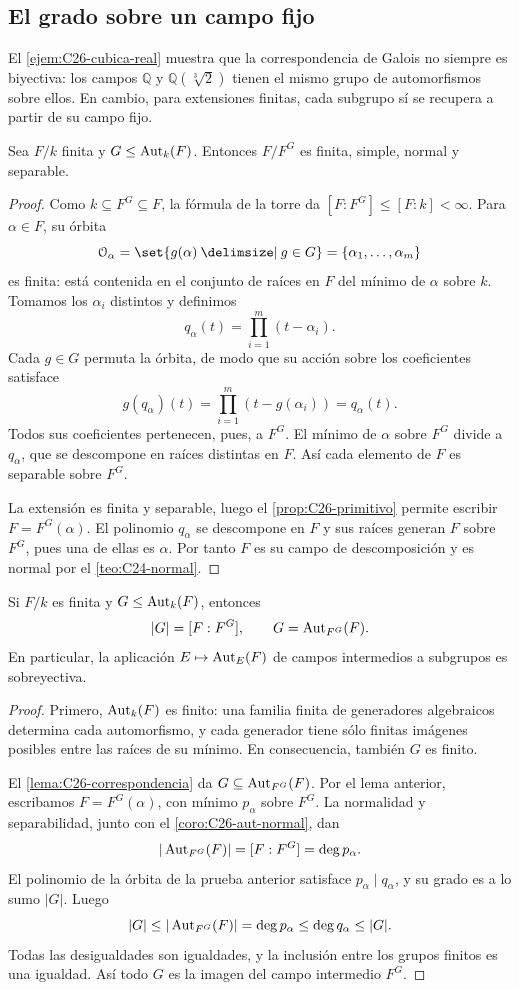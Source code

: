 \subsection{El grado sobre un campo fijo}\label{tema:27-1-1}
El \cref{ejem:C26-cubica-real} muestra que la correspondencia de Galois no siempre es biyectiva: los campos $\mathbb Q$ y $\mathbb Q(\sqrt[3]{2})$ tienen el mismo grupo de automorfismos sobre ellos. En cambio, para extensiones finitas, cada subgrupo sí se recupera a partir de su campo fijo.

\begin{lema}\label{lema:C27-campo-fijo}
Sea $F/k$ finita y $G\leq\operatorname{Aut}_k(F)$. Entonces $F/F^G$ es finita, simple, normal y separable.
\end{lema}
\begin{proof}
Como $k\subseteq F^G\subseteq F$, la fórmula de la torre da $[F:F^G]\leq[F:k]<\infty$. Para $\alpha\in F$, su órbita
\[
\mathcal O_\alpha=\set{g(\alpha)\given g\in G}=\{\alpha_1,\ldots,\alpha_m\}
\]
es finita: está contenida en el conjunto de raíces en $F$ del mínimo de $\alpha$ sobre $k$. Tomamos los $\alpha_i$ distintos y definimos
\[
q_\alpha(t)=\prod_{i=1}^m(t-\alpha_i).
\]
Cada $g\in G$ permuta la órbita, de modo que su acción sobre los coeficientes satisface
\[
g(q_\alpha)(t)=\prod_{i=1}^m(t-g(\alpha_i))=q_\alpha(t).
\]
Todos sus coeficientes pertenecen, pues, a $F^G$. El mínimo de $\alpha$ sobre $F^G$ divide a $q_\alpha$, que se descompone en raíces distintas en $F$. Así cada elemento de $F$ es separable sobre $F^G$.

La extensión es finita y separable, luego el \cref{prop:C26-primitivo} permite escribir $F=F^G(\alpha)$. El polinomio $q_\alpha$ se descompone en $F$ y sus raíces generan $F$ sobre $F^G$, pues una de ellas es $\alpha$. Por tanto $F$ es su campo de descomposición y es normal por el \cref{teo:C24-normal}.
\end{proof}

\begin{prop}\label{prop:C27-artin}
Si $F/k$ es finita y $G\leq\operatorname{Aut}_k(F)$, entonces
\[
|G|=[F:F^G],\qquad G=\operatorname{Aut}_{F^G}(F).
\]
En particular, la aplicación $E\mapsto\operatorname{Aut}_E(F)$ de campos intermedios a subgrupos es sobreyectiva.
\end{prop}
\begin{proof}
Primero, $\operatorname{Aut}_k(F)$ es finito: una familia finita de generadores algebraicos determina cada automorfismo, y cada generador tiene sólo finitas imágenes posibles entre las raíces de su mínimo. En consecuencia, también $G$ es finito.

El \cref{lema:C26-correspondencia} da $G\subseteq\operatorname{Aut}_{F^G}(F)$. Por el lema anterior, escribamos $F=F^G(\alpha)$, con mínimo $p_\alpha$ sobre $F^G$. La normalidad y separabilidad, junto con el \cref{coro:C26-aut-normal}, dan
\[
|\operatorname{Aut}_{F^G}(F)|=[F:F^G]=\deg p_\alpha.
\]
El polinomio de la órbita de la prueba anterior satisface $p_\alpha\mid q_\alpha$, y su grado es a lo sumo $|G|$. Luego
\[
|G|\leq|\operatorname{Aut}_{F^G}(F)|=\deg p_\alpha
\leq\deg q_\alpha\leq|G|.
\]
Todas las desigualdades son igualdades, y la inclusión entre los grupos finitos es una igualdad. Así todo $G$ es la imagen del campo intermedio $F^G$.
\end{proof}

